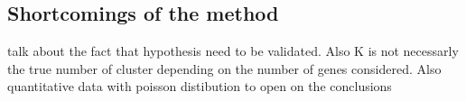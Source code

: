 		\subsection{Shortcomings of the method}
		talk about the fact that hypothesis need to be validated. Also K is not necessarly the true number of cluster depending on the number of genes considered. Also quantitative data with poisson distibution to open on the conclusions
	




